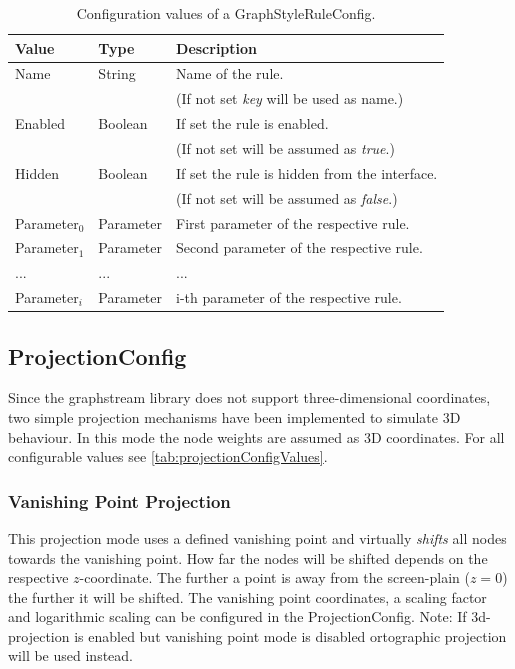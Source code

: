 \begin{table}[h]
\centering
\begin{tabular}[h]{|l|l|l|}\hline
	\textbf{Value} & \textbf{Type} & \textbf{Description}\\
	\hline
	Name & String & Name of the rule.\\
	& & (If not set \emph{key} will be used as name.)\\
	\hline
	Enabled & Boolean & If set the rule is enabled.\\
	& & (If not set will be assumed as \emph{true}.)\\
	\hline
	Hidden & Boolean & If set the rule is hidden from the interface.\\
	& & (If not set will be assumed as \emph{false}.)\\
	\hline
	Parameter$_0$ & Parameter & First parameter of the respective rule.\\
	\hline
	Parameter$_1$ & Parameter & Second parameter of the respective rule.\\
	\hline
	... & ... & ...\\
	\hline	
	Parameter$_i$ & Parameter & i-th parameter of the respective rule.\\
	\hline
\end{tabular}
\caption{Configuration values of a GraphStyleRuleConfig.}
\label{tab:graphStyleRuleConfigValues}
\end{table}


\subsection{ProjectionConfig}
\label{ss:projectionConfig}
Since the graphstream library does not support three-dimensional coordinates, two simple projection mechanisms have been implemented to simulate 3D behaviour. In this mode the node weights are assumed as 3D coordinates. For all configurable values see \ref{tab:projectionConfigValues}.

\subsubsection{Vanishing Point Projection}
This projection mode uses a defined vanishing point and virtually \emph{shifts} all nodes towards the vanishing point. How far the nodes will be shifted depends on the respective $z$-coordinate. The further a point is away from the screen-plain ($z=0$) the further it will be shifted. The vanishing point coordinates, a scaling factor and logarithmic scaling can be configured in the ProjectionConfig. Note: If 3d-projection is enabled but vanishing point mode is disabled ortographic projection will be used instead.


